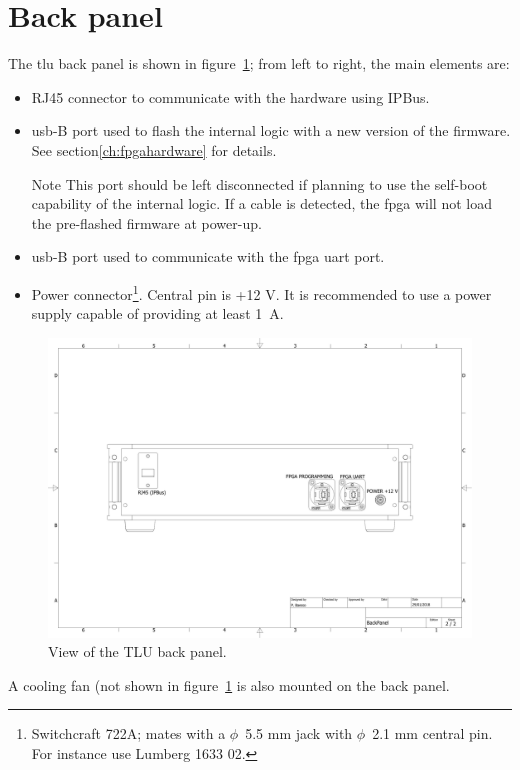 \section{Back panel}\label{ch:backpanelintro}
The \gls{tlu} back panel is shown in figure~\ref{fig:backpanel}; from left to right, the main elements are:
\begin{itemize}
  \item RJ45 connector to communicate with the hardware using IPBus.
  \item \gls{usb}-B port used to flash the internal logic with a new version of the firmware. See section\ref{ch:fpgahardware} for details.
  \begin{alertinfo}{Note}
    This port should be left disconnected if planning to use the self-boot capability of the internal logic. If a cable is detected, the \gls{fpga} will not load the pre-flashed firmware at power-up.
  \end{alertinfo}
  \item \gls{usb}-B port used to communicate with the \gls{fpga} \gls{uart} port.
  \item Power connector\footnote{Switchcraft 722A; mates with a $\phi$~5.5 mm jack with $\phi$~2.1 mm central pin. For instance use Lumberg 1633 02.}. Central pin is +12 V. It is recommended to use a power supply capable of providing at least 1~A.
\end{itemize}
\begin{figure}
  \centering
  \includegraphics[width=.950\textwidth]{./Images/backPaneldoc.pdf}
  \caption{View of the TLU back panel.}
  \label{fig:backpanel}
\end{figure}
A cooling fan (not shown in figure~\ref{fig:backpanel} is also mounted on the back panel.

